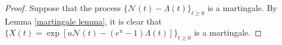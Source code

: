 \documentclass[11pt,oneside,reqno]{amsart}
\theoremstyle{definition}
\theoremstyle{remarkstyle}
\begin{document}
\begin{proof}
    Suppose that the process $\{\mathcal{N}(t)-\Lambda(t)\}_{t\ge 0}$ is a martingale. By Lemma \ref{martingale lemma}, it is clear that $\{X(t)=\exp[u\mathcal{N}(t)-(e^u-1)\Lambda(t)]\}_{t\ge 0}$ is a martingale. 


\end{proof}
\end{document}
